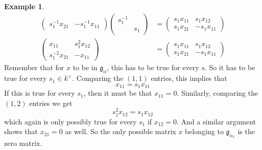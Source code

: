 \documentclass[12pt]{article}
\theoremstyle{definition}
\newtheorem{example}[theorem]{Example}
\numberwithin{theorem}{subsection}
\newcommand{\inv}{^{-1}}
\newcommand{\frakg}{\mathfrak{g}}
\begin{document}
\begin{example}
\begin{align*}
\begin{pmatrix}
		s_1 \inv x_{21} & - s_1 \inv x_{11}
	\end{pmatrix}
	\begin{pmatrix}
		s_1 \inv \\
		& s_1
	\end{pmatrix}
	&=
	\begin{pmatrix}
		s_1 x_{11} &  s_1 x_{12} \\
		s_1 x_{21} & - s_1 x_{11}
	\end{pmatrix} \\
	\begin{pmatrix}
		x_{11} & s_1^2 x_{12} \\
		s_1^{-2} x_{21} & - x_{11}
	\end{pmatrix}
	&=
	\begin{pmatrix}
		s_1 x_{11} &  s_1 x_{12} \\
		s_1 x_{21} & - s_1 x_{11}
	\end{pmatrix} 
\end{align*}
Remember that for $x$ to be in $\frakg_{\alpha}$, this has to be true for every $s$. So it has to be true for every $s_1 \in k^\times$. Comparing the $(1,1)$ entries, this implies that
\[
	x_{11} = s_1 x_{11}
\]
If this is true for every $s_1$, then it must be that $x_{11} = 0$. Similarly, comparing the $(1,2)$ entries we get
\[
	s_1^2 x_{12} = s_1 x_{12}
\]
which again is only possibly true for every $s_1$ if $x_{12} = 0$. And a similar argument shows that $x_{21} = 0$ as well. So the only possible matrix $x$ belonging to $\frakg_{\alpha_1}$ is the zero matrix.
\end{example}
\end{document}
